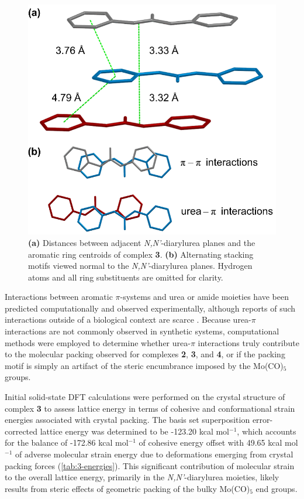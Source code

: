 \begin{figure}[h!]
    \centering
    \includegraphics[width=0.8\linewidth]{figures/pub2/stacking.png}
    \caption{\textbf{(a)} Distances between adjacent \textit{N,N'}-diarylurea planes and the aromatic ring centroids of complex \textbf{3}. \textbf{(b)} Alternating stacking motifs viewed normal to the \textit{N,N'}-diarylurea planes. Hydrogen atoms and all ring substituents are omitted for clarity.}\label{stacking}
\end{figure}

Interactions between aromatic $\pi$-systems and urea or amide moieties have been predicted computationally and observed experimentally, although reports of such interactions outside of a biological context are scarce \citep{Imai2009, Kasavajhala2015, Goyal2017a, Ema2018}. Because urea-$\pi$ interactions are not commonly observed in synthetic systems, computational methods were employed to determine whether urea-$\pi$ interactions truly contribute to the molecular packing observed for complexes \textbf{2}, \textbf{3}, and \textbf{4}, or if the packing motif is simply an artifact of the steric encumbrance imposed by the Mo(CO)$_{5}$ groups. 

Initial solid-state DFT calculations were performed on the crystal structure of complex \textbf{3} to assess lattice energy in terms of cohesive and conformational strain energies associated with crystal packing. The basis set superposition error-corrected lattice energy was determined to be -123.20 kcal mol$^{-1}$, which accounts for the balance of -172.86 kcal mol$^{-1}$ of cohesive energy offset with 49.65 kcal mol$^{-1}$ of adverse molecular strain energy due to deformations emerging from crystal packing forces (\autoref{tab:3-energies}). This significant contribution of molecular strain to the overall lattice energy, primarily in the \textit{N,N'}-diarylurea moieties, likely results from steric effects of geometric packing of the bulky Mo(CO)$_{5}$ end groups. 

